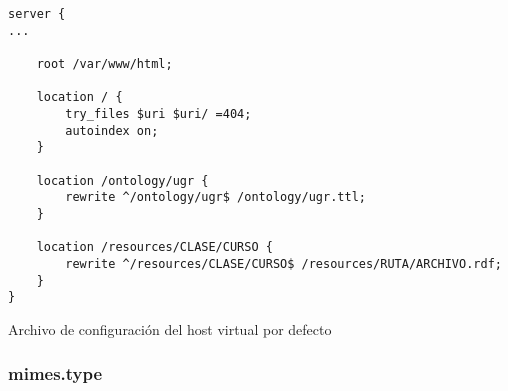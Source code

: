 \bigskip
\begin{listing}[!ht]
\begin{verbatim}
server {
...

    root /var/www/html;
	
	location / {
		try_files $uri $uri/ =404;
		autoindex on;
	}
	
	location /ontology/ugr {
		rewrite ^/ontology/ugr$ /ontology/ugr.ttl;
	}
	
	location /resources/CLASE/CURSO {
		rewrite ^/resources/CLASE/CURSO$ /resources/RUTA/ARCHIVO.rdf;
	}
}
\end{verbatim}
\caption{Archivo de configuración del {\sf host virtual} por defecto}
\end{listing}

\subsubsection{mimes.type}


